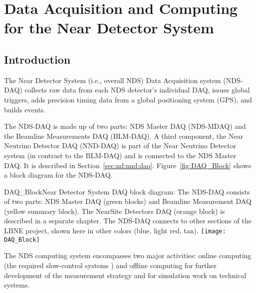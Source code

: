 \chapter{Data Acquisition and Computing for the Near Detector System} %
\label{ch:nd-gdaq}

\section{Introduction}
\label{sec:nd-gdaq-intro}

The Near Detector System (i.e., overall NDS) Data Acquisition system (NDS-DAQ) collects raw data from each NDS detector's
individual DAQ, %
issues global  triggers, adds precision timing 
data from a global positioning system (GPS), and builds events. %

The NDS-DAQ is made up of two parts: NDS Master DAQ (NDS-MDAQ) and the Beamline Measurements 
DAQ (BLM-DAQ). A third component, the Near Neutrino Detector DAQ (NND-DAQ) is part of the Near Neutrino Detector system (in contrast to the BLM-DAQ) and is 
connected to the NDS Master DAQ. It is described in Section~\ref{sec:nd:nnd:daq}.
Figure~\ref{fig:DAQ_Block} shows a block diagram for the NDS-DAQ.


\begin{cdrfigure}{DAQ_Block}{Near Detector System DAQ block diagram: The NDS-DAQ consists 
of two parts: NDS Master DAQ (green blocks) and Beamline Measurement DAQ (yellow summary 
block). The NearSite Detectors DAQ (orange block) is described in a separate chapter. The 
NDS-DAQ connects to other sections of the LBNE project, shown here in other colors (blue, 
light red, tan).}
\texttt{[image: DAQ\_Block]}
\end{cdrfigure}

The NDS computing system encompasses two major activities: online computing (the required
slow-control systems ) and offline computing for further development of the measurement 
strategy and for simulation work on technical systems. 

